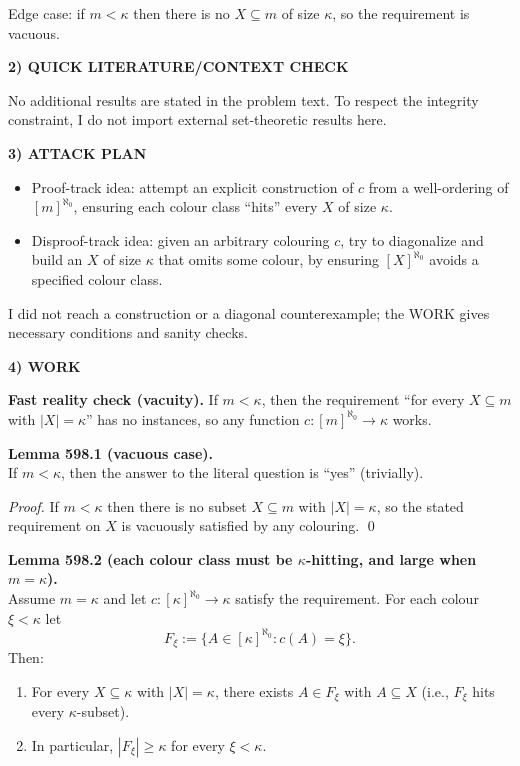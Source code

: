 Edge case: if $m<\kappa$ then there is no $X\subseteq m$ of size $\kappa$, so the requirement is vacuous.

\noindent\textbf{2) QUICK LITERATURE/CONTEXT CHECK}\par
No additional results are stated in the problem text. To respect the integrity constraint, I do not import external set-theoretic results here.

\noindent\textbf{3) ATTACK PLAN}\par
\begin{itemize}
\item Proof-track idea: attempt an explicit construction of $c$ from a well-ordering of $[m]^{\aleph_0}$, ensuring each colour class ``hits'' every $X$ of size $\kappa$.
\item Disproof-track idea: given an arbitrary colouring $c$, try to diagonalize and build an $X$ of size $\kappa$ that omits some colour, by ensuring $[X]^{\aleph_0}$ avoids a specified colour class.
\end{itemize}
I did not reach a construction or a diagonal counterexample; the WORK gives necessary conditions and sanity checks.

\noindent\textbf{4) WORK}\par
\textbf{Fast reality check (vacuity).} If $m<\kappa$, then the requirement ``for every $X\subseteq m$ with $|X|=\kappa$'' has no instances, so any function $c:[m]^{\aleph_0}\to\kappa$ works.

\medskip
\noindent\textbf{Lemma 598.1 (vacuous case).}\\
If $m<\kappa$, then the answer to the literal question is ``yes'' (trivially).

\noindent\emph{Proof.} If $m<\kappa$ then there is no subset $X\subseteq m$ with $|X|=\kappa$, so the stated requirement on $X$ is vacuously satisfied by any colouring. \qed

\medskip
\noindent\textbf{Lemma 598.2 (each colour class must be $\kappa$-hitting, and large when $m=\kappa$).}\\
Assume $m=\kappa$ and let $c:[\kappa]^{\aleph_0}\to\kappa$ satisfy the requirement. For each colour $\xi<\kappa$ let
\[
F_{\xi}:=\{A\in[\kappa]^{\aleph_0}: c(A)=\xi\}.
\]
Then:
\begin{enumerate}
\item For every $X\subseteq\kappa$ with $|X|=\kappa$, there exists $A\in F_{\xi}$ with $A\subseteq X$ (i.e., $F_{\xi}$ hits every $\kappa$-subset).
\item In particular, $|F_{\xi}|\ge\kappa$ for every $\xi<\kappa$.
\end{enumerate}

